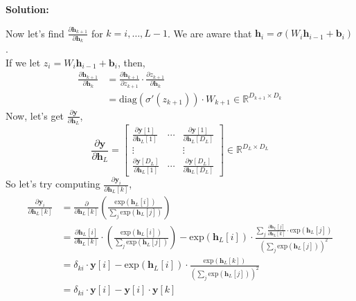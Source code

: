 \documentclass{article}
\newenvironment{solution}
  {\par\noindent\textbf{Solution:}\par}
  {\par}
\begin{document}
\begin{solution}
  Now let's find $\frac{\partial \textbf{h}_{k + 1}}{\partial \textbf{h}_{k}}$ for $k=i,\dots,L-1$. We are aware that $\textbf{h}_i = \sigma \left(W_i\textbf{h}_{i-1} + \textbf{b}_i \right)$. \\ 
  If we let $z_i = W_i\textbf{h}_{i-1} +\textbf{b}_i$, then,
  \[
    \begin{aligned}
      \frac{\partial \textbf{h}_{k+1}}{\partial \textbf{h}_k} &= \frac{\partial \textbf{h}_{k+1}}{\partial z_{k+1}}\cdot \frac{\partial z_{k+1}}{\partial \textbf{h}_k}  \\ 
                                                              &= \text{diag}(\sigma'(z_{k+1})) \cdot W_{k+1} \in \mathbb{R}^{D_{k+1} \times D_k}
    \end{aligned}
  \]
  Now, let's get $\frac{\partial \textbf{y}}{\partial \textbf{h}_L}$,
\[
  \frac{\partial \textbf{y}}{\partial \textbf{h}_L} = \begin{bmatrix}     
    \frac{\partial \textbf{y}[1]}{\partial \textbf{h}_L[1]} & \cdots & \frac{\partial \textbf{y}[1]}{\partial \textbf{h}_L[D_L]} \\ 
    \vdots & & \vdots \\ 
    \frac{\partial \textbf{y}[D_L]}{\partial \textbf{h}_L[1]} & \cdots  & \frac{\partial \textbf{y}[D_L]}{\partial \textbf{h}_L[D_L]} 

  \end{bmatrix} \in \mathbb{R}^{D_L \times D_L}
\]
So let's try computing $\frac{\partial \textbf{y}_i}{\partial \textbf{h}_L[k]}$,
\[
  \begin{aligned}
    \frac{\partial \textbf{y}_i}{\partial \textbf{h}_L[k]} &= \frac{\partial}{\partial \textbf{h}_L[k]} \left( \frac{\text{exp}(\textbf{h}_L[i])}{\sum_j \text{exp}(\textbf{h}_L[j])} \right) \\ 
                                                           &= \frac{\partial \textbf{h}_L[i]}{\partial \textbf{h}_L[k]} \cdot \left( \frac{\text{exp}(\textbf{h}_L[i])}{\sum_j \text{exp}(\textbf{h}_L[j])} \right) - \text{exp}(\textbf{h}_L[i])\cdot \frac{\sum_j \frac{\partial \textbf{h}_L[j]}{\partial \textbf{h}_L[k]}\cdot \text{exp}(\textbf{h}_L[j])}{\left( \sum_j \text{exp}(\textbf{h}_L[j]) \right)^2} \\ 
                                                           &= \delta_{ki} \cdot \textbf{y}[i] - \text{exp}(\textbf{h}_L[i]) \cdot \frac{\text{exp}(\textbf{h}_L[k])}{\left( \sum_j \text{exp}(\textbf{h}_L[j]) \right)^2} \\ 
                                                           &= \delta_{ki} \cdot \textbf{y}[i] - \textbf{y}[i] \cdot \textbf{y}[k]
  \end{aligned}
\]


\end{solution}
\end{document}
